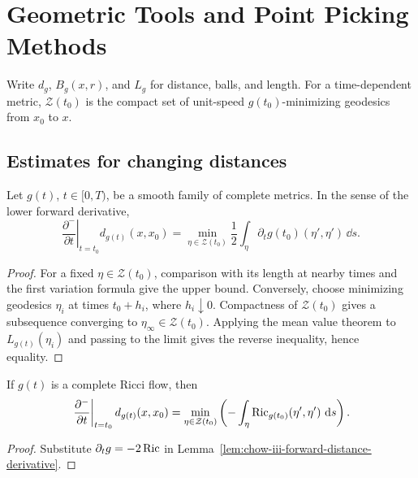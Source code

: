 \chapter[18]{Geometric Tools and Point Picking Methods}
\label{ch:chow-iii-geometric-tools-point-picking}

Write \(d_g\), \(B_g(x,r)\), and \(L_g\) for distance, balls, and length.
For a time-dependent metric, \(\mathcal Z(t_0)\) is the compact set of
unit-speed \(g(t_0)\)-minimizing geodesics from \(x_0\) to \(x\).

\section{Estimates for changing distances}

\begin{lemma}
\label{lem:chow-iii-forward-distance-derivative}

Let \(g(t)\), \(t\in[0,T)\), be a smooth family of complete metrics.  In the
sense of the lower forward derivative,
\[
 \left.\frac{\partial^-}{\partial t}\right|_{t=t_0}d_{g(t)}(x,x_0)
 =\min_{\eta\in\mathcal Z(t_0)}\frac12\int_\eta
 \partial_tg(t_0)(\eta',\eta')\,\dd s .
\]
\end{lemma}
\begin{proof}
\sketch For a fixed \(\eta\in\mathcal Z(t_0)\), comparison with its length at nearby
times and the first variation formula give the upper bound.  Conversely,
choose minimizing geodesics \(\eta_i\) at times \(t_0+h_i\), where
\(h_i\downarrow0\).  Compactness of \(\mathcal Z(t_0)\) gives a subsequence
converging to \(\eta_\infty\in\mathcal Z(t_0)\).  Applying the mean value
theorem to \(L_{g(t)}(\eta_i)\) and passing to the limit gives the reverse
inequality, hence equality.
\end{proof}

\begin{corollary}
\label{cor:chow-iii-forward-distance-derivative-ricci-flow}


If \(g(t)\) is a complete Ricci flow, then
\[
 \left.\frac{\partial^-}{\partial t}\right|_{t=t_0}d_{g(t)}(x,x_0)
 =\min_{\eta\in\mathcal Z(t_0)}
 \left(-\int_\eta\operatorname{Ric}_{g(t_0)}(\eta',\eta')\,\,\mathrm{d} s\right).
\]
\end{corollary}
\begin{proof}
\sketch Substitute \(\partial_tg=-2\operatorname{Ric}\) in
Lemma~\ref{lem:chow-iii-forward-distance-derivative}.
\end{proof}

